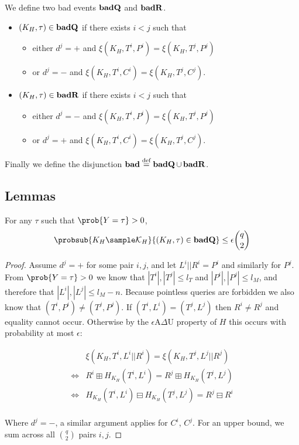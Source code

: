 \documentclass[eprint.tex]{subfiles}
\begin{document}
We define two bad events $\operatorname{\mathbf{badQ}}$ and $\operatorname{\mathbf{badR}}$.

\begin{itemize}
    \item $(K_H, \tau) \in \operatorname{\mathbf{badQ}}$ if there exists $i < j$ such that
    \begin{itemize}
        \item either $d^j = +$ and $\xi(K_H, T^i, P^i) = \xi(K_H, T^j, P^j)$
        \item or $d^j = -$ and $\xi(K_H, T^i, C^i) = \xi(K_H, T^j, C^j)$.
    \end{itemize}
    \item $(K_H, \tau) \in \operatorname{\mathbf{badR}}$ if there exists $i < j$ such that
    \begin{itemize}
        \item either $d^j = -$ and $\xi(K_H, T^i, P^i) = \xi(K_H, T^j, P^j)$
        \item or $d^j = +$ and $\xi(K_H, T^i, C^i) = \xi(K_H, T^j, C^j)$.
    \end{itemize}
\end{itemize}

Finally we define the disjunction
$\operatorname{\mathbf{bad}} \stackrel{\text{def}}{=} \operatorname{\mathbf{badQ}} \cup \operatorname{\mathbf{badR}}$.

\subsection{Lemmas}
\begin{lemma} \label{badQ}
    For any $\tau$ such that $\prob{Y = \tau} > 0$,
    \begin{displaymath}
        \probsub{K_H \sample \mathcal{K}_H}{(K_H, \tau) \in \badQ}
        \leq \epsilon \binom{q}{2}
    \end{displaymath}
\end{lemma}

\begin{proof}
Assume $d^j = +$ for some pair $i, j$, and let $L^i || R^i = P^i$ and similarly for $P^j$.
From $\prob{Y = \tau} > 0$ we know that $|T^i|, |T^j| \leq l_T$ and $|P^i|, |P^j| \leq l_M$,
and therefore that $|L^i|, |L^j| \leq l_M - n$.
Because pointless queries are forbidden we also know that $(T^i, P^i) \neq (T^j, P^j)$.
If $(T^i, L^i) = (T^j, L^j)$ then $R^i \neq R^j$ and equality cannot occur.
Otherwise by the $\epsilon$A$\Delta$U property of $H$ this occurs with probability
at most $\epsilon$:

\begin{align*}
    &\xi(K_H, T^i, L^i||R^i) = \xi(K_H, T^j, L^j||R^j) \\
    \Leftrightarrow& R^i \boxplus H_{K_H}(T^i, L^i) = R^j \boxplus H_{K_H}(T^j, L^j) \\
    \Leftrightarrow& H_{K_H}(T^i, L^i) \boxminus H_{K_H}(T^j, L^j) = R^j \boxminus R^i \\
\end{align*}

Where $d^j = -$, a similar argument applies for $C^i$, $C^j$.
For an upper bound, we sum across all $\binom{q}{2}$ pairs $i, j$.
\end{proof}
\end{document}
